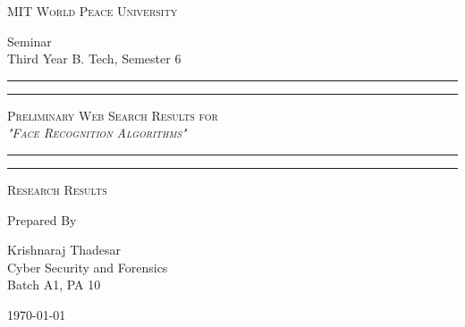 \documentclass[11pt]{article}
\begin{document}
\begin{titlepage}
	\centering


	\huge\textsc{
		MIT World Peace University
	}\\

	\vspace{0.75\baselineskip} %

	\LARGE{
		Seminar\\
    Third Year B. Tech, Semester 6
	}

	\vfill %


	\rule{\textwidth}{1.6pt}\vspace{-\baselineskip}\vspace{2pt}
	\rule{\textwidth}{0.6pt}
	\vspace{0.75\baselineskip} %



	\huge{\textsc{
Preliminary Web Search Results for \\
			\textit{"Face Recognition Algorithms"}
		}} \\



	\vspace{0.5\baselineskip} %
	\rule{\textwidth}{0.6pt}\vspace{-\baselineskip}\vspace{2.8pt}
	\rule{\textwidth}{1.6pt}

	\vspace{1\baselineskip} %


	\LARGE\textsc{
		Research Results
	} %
	\vfill


	Prepared By
	\vspace{0.5\baselineskip} %

	\Large{
		Krishnaraj Thadesar \\
		Cyber Security and Forensics\\
		Batch A1, PA 10
	}


	\vspace{0.5\baselineskip} %
	\today

\end{titlepage}
\end{document}
